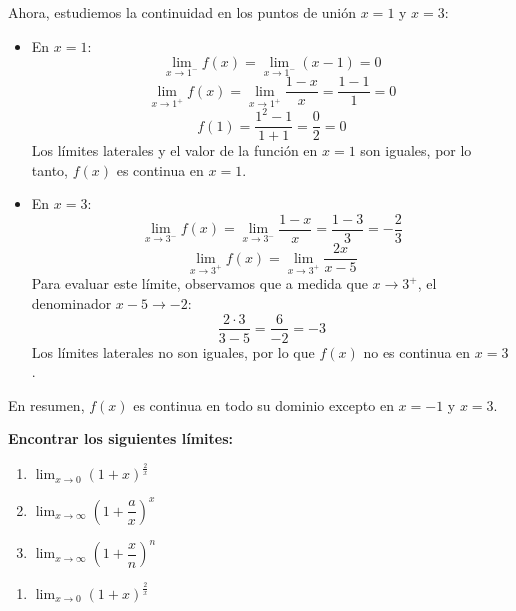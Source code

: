 \documentclass[answers]{exam} %
\begin{document}
\begin{questions}
\begin{solution}
        Ahora, estudiemos la continuidad en los puntos de unión \( x = 1 \) y \( x = 3 \):
        
        \begin{itemize}
            \item En \( x = 1 \):
                \[
                \lim_{x \to 1^-} f(x) = \lim_{x \to 1^-} (x - 1) = 0
                \]
                \[
                \lim_{x \to 1^+} f(x) = \lim_{x \to 1^+} \frac{1 - x}{x} = \frac{1 - 1}{1} = 0
                \]
                \[
                f(1) = \frac{1^2 - 1}{1 + 1} = \frac{0}{2} = 0
                \]
                Los límites laterales y el valor de la función en \( x = 1 \) son iguales, por lo tanto, \( f(x) \) es continua en \( x = 1 \).
                
            \item En \( x = 3 \):
                \[
                \lim_{x \to 3^-} f(x) = \lim_{x \to 3^-} \frac{1 - x}{x} = \frac{1 - 3}{3} = -\frac{2}{3}
                \]
                \[
                \lim_{x \to 3^+} f(x) = \lim_{x \to 3^+} \frac{2x}{x - 5}
                \]
                Para evaluar este límite, observamos que a medida que \( x \to 3^+ \), el denominador \( x - 5 \to -2 \):
                \[
                \frac{2 \cdot 3}{3 - 5} = \frac{6}{-2} = -3
                \]
                Los límites laterales no son iguales, por lo que \( f(x) \) no es continua en \( x = 3 \).
        \end{itemize}
        
        En resumen, \( f(x) \) es continua en todo su dominio excepto en \( x = -1 \) y \( x = 3 \).
    \end{solution}
    

    \vspace{0.5cm}
    \question \large\textbf{Encontrar los siguientes límites:}
    \begin{enumerate}[label=\alph*.]
		\item $\displaystyle \lim_{x\to{0}} (1+x)^{\frac{2}{x}}$
		\item $\displaystyle \lim_{x\to{\infty}} (1+\dfrac{a}{x})^{x}$
		\item $\displaystyle \lim_{x\to{\infty}} (1+\dfrac{x}{n})^{n}$
		
	\end{enumerate}
    \begin{solution}
    
        \begin{enumerate}[label=\alph*.]
            \item \(\displaystyle \lim_{x\to{0}} (1+x)^{\frac{2}{x}}\)
    

\end{enumerate}
\end{solution}
\end{questions}
\end{document}
